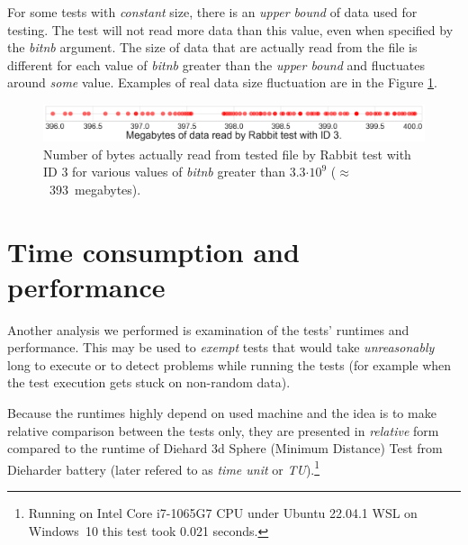 \documentclass[
  digital,     %
  oneside,     %
  nosansbold,  %
  nocolorbold, %
  nolof,         %
  nolot,         %
]{fithesis4}
\begin{document}
For some tests with \emph{constant} size, there is an \emph{upper bound} of data used for testing. The test will not read more data than this value, even when specified by the \emph{bit\textunderscore nb} argument. The size of data that are actually read from the file is different for each value of \emph{bit\textunderscore nb} greater than the \emph{upper bound} and fluctuates around \emph{some} value. Examples of real data size fluctuation are in the Figure \ref{fig:analysis-rabbit-max}.

\begin{figure}[h]
  \begin{center}
    \includegraphics[width=12.7cm]{figures/rabbit_3_maxims.png}
  \end{center}
  \caption{Number of bytes actually read from tested file by Rabbit test with ID 3 for various values of \emph{bit\textunderscore nb} greater than 3.3$\cdot10^{9}$ ($\approx$~393~megabytes).}
  \label{fig:analysis-rabbit-max}
\end{figure}




\section{Time consumption and performance} \label{chap:analysis-times}


Another analysis we performed is examination of the tests' runtimes and performance. This may be used to \emph{exempt} tests that would take \emph{unreasonably} long to execute or to detect problems while running the tests (for example when the test execution gets stuck on non-random data).

Because the runtimes highly depend on used machine and the idea is to make relative comparison between the tests only, they are presented in \emph{relative} form compared to the runtime of Diehard 3d Sphere (Minimum Distance) Test from Dieharder battery (later refered to as \emph{time unit} or \emph{TU}).\footnote{Running on Intel Core i7-1065G7 CPU under Ubuntu 22.04.1 WSL on Windows~10 this test took 0.021 seconds.} 
\end{document}
